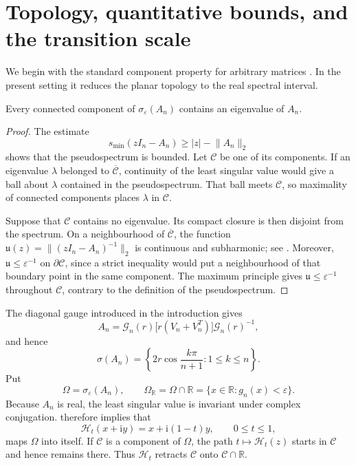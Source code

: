 \documentclass[review,hidelinks,onefignum,onetabnum]{siamart251216}
\newcommand{\R}{\mathbb R}
\newcommand{\ii}{\mathrm i}
\begin{document}
\section{Topology, quantitative bounds, and the transition scale}
\label{sec:topology-bounds}

We begin with the standard component property for arbitrary matrices
\cite{BurkeLewisOverton2003}.  In the present setting it reduces the planar
topology to the real spectral interval.

\begin{lemma}\label{lem:component}
Every connected component of \(\sigma_\varepsilon(A_n)\) contains an
eigenvalue of \(A_n\).
\end{lemma}

\begin{proof}
The estimate
\[
 s_{\min}(zI_n-A_n)\geq |z|-\lVert A_n\rVert_2
\]
shows that the pseudospectrum is bounded.  Let \(\mathcal C\) be one of
its components.  If an eigenvalue \(\lambda\) belonged to
\(\overline{\mathcal C}\), continuity of the least singular value would
give a ball about \(\lambda\) contained in the pseudospectrum.  That
ball meets \(\mathcal C\), so maximality of connected components places
\(\lambda\) in \(\mathcal C\).

Suppose that \(\mathcal C\) contains no eigenvalue.  Its compact closure
is then disjoint from the spectrum.  On a neighbourhood of
\(\overline{\mathcal C}\), the function
\(\mathfrak u(z)=\lVert(zI_n-A_n)^{-1}\rVert_2\) is continuous and
subharmonic; see
\cite{TrefethenEmbree2005}.  Moreover,
\(\mathfrak u\leq\varepsilon^{-1}\) on \(\partial\mathcal C\), since a strict
inequality would put a neighbourhood of that boundary point in the same
component.  The maximum principle gives
\(\mathfrak u\leq\varepsilon^{-1}\) throughout \(\mathcal C\), contrary to the
definition of the pseudospectrum.
\end{proof}

The diagonal gauge introduced in the introduction gives
\[
 A_n=\mathcal G_n(r)\bigl[r(V_n+V_n^T)\bigr]
 \mathcal G_n(r)^{-1},
\]
and hence
\begin{equation}\label{eq:spectrum}
 \sigma(A_n)=\left\{2r\cos\frac{k\pi}{n+1}:1\leq k\leq n\right\}.
\end{equation}
Put
\[
 \Omega=\sigma_\varepsilon(A_n),\qquad
 \Omega_\R=\Omega\cap\R=\{x\in\R:g_n(x)<\varepsilon\}.
\]
Because \(A_n\) is real, the least singular value is invariant under
complex conjugation.   therefore implies that
\[
 \mathcal H_t(x+\ii y)=x+\ii(1-t)y,\qquad0\leq t\leq1,
\]
maps \(\Omega\) into itself.  If \(\mathcal C\) is a component of
\(\Omega\), the path \(t\mapsto\mathcal H_t(z)\) starts in
\(\mathcal C\) and hence remains there.  Thus \(\mathcal H_t\) retracts
\(\mathcal C\) onto
\(\mathcal C\cap\R\).
\end{document}
